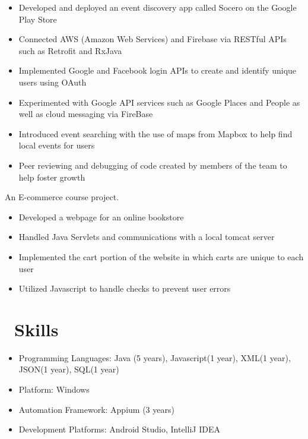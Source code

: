 \documentclass{resume}
\begin{document}

\begin{itemize}
  \item Developed and deployed an event discovery app called Socero on the Google Play Store 
  \item Connected AWS (Amazon Web Services) and Firebase via RESTful APIs such as Retrofit and RxJava
  \item Implemented Google and Facebook login APIs to create and identify unique users using OAuth
  \item Experimented with Google API services such as Google Places and People as well as cloud messaging via FireBase
  \item Introduced event searching with the use of maps from Mapbox to help find local events for users
  \item Peer reviewing and debugging of code created by members of the team to help foster growth
\end{itemize}


An E-commerce course project.
\begin{itemize}
  \item Developed a webpage for an online bookstore
  \item Handled Java Servlets and communications with a local tomcat server
  \item Implemented the cart portion of the website in which carts are unique to each user
  \item Utilized Javascript to handle checks to prevent user errors
\end{itemize}


\section{\faCogs\ Skills}
\begin{itemize}[parsep=0.5ex]
  \item Programming Languages: Java (5 years), Javascript(1 year), XML(1 year), JSON(1 year), SQL(1 year)
  \item Platform: Windows
  \item Automation Framework: Appium (3 years)
  \item Development Platforms: Android Studio, IntelliJ IDEA
\end{itemize}
\end{document}
